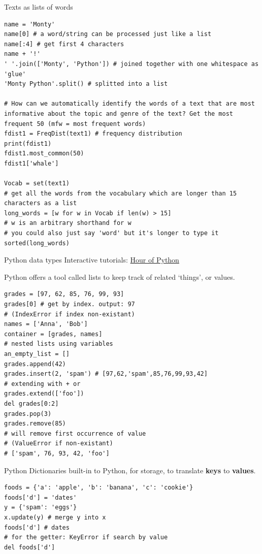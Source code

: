 \documentclass[10pt]{beamer}
\begin{document}
\begin{frame}{Texts as lists of words} 
\begin{verbatim}
name = 'Monty'
name[0] # a word/string can be processed just like a list
name[:4] # get first 4 characters
name + '!'
' '.join(['Monty', 'Python']) # joined together with one whitespace as 'glue'
'Monty Python'.split() # splitted into a list

# How can we automatically identify the words of a text that are most informative about the topic and genre of the text? Get the most frequent 50 (mfw = most frequent words)
fdist1 = FreqDist(text1) # frequency distribution
print(fdist1)
fdist1.most_common(50)
fdist1['whale']

Vocab = set(text1)
# get all the words from the vocabulary which are longer than 15 characters as a list
long_words = [w for w in Vocab if len(w) > 15] 
# w is an arbitrary shorthand for w
# you could also just say 'word' but it's longer to type it
sorted(long_words)
\end{verbatim}
\end{frame}



\begin{frame}{Python data types}
Interactive tutorials: \href{https://hourofpython.com/}{Hour of Python}

Python offers a tool called lists to keep track of related `things', or values.

\begin{verbatim}
grades = [97, 62, 85, 76, 99, 93]
grades[0] # get by index. output: 97
# (IndexError if index non-existant)
names = ['Anna', 'Bob']
container = [grades, names] 
# nested lists using variables
an_empty_list = []
grades.append(42)
grades.insert(2, 'spam') # [97,62,'spam',85,76,99,93,42]
# extending with + or 
grades.extend(['foo'])
del grades[0:2]
grades.pop(3)
grades.remove(85)
# will remove first occurrence of value
# (ValueError if non-existant)
# ['spam', 76, 93, 42, 'foo']
\end{verbatim}
\end{frame}

\begin{frame}{Python Dictionaries}
 built-in to Python, for storage, to translate \textbf{keys} to \textbf{values}.

 \begin{verbatim}
foods = {'a': 'apple', 'b': 'banana', 'c': 'cookie'}
foods['d'] = 'dates'
y = {'spam': 'eggs'}
x.update(y) # merge y into x
foods['d'] # dates 
# for the getter: KeyError if search by value
del foods['d']
\end{verbatim}
\end{frame}
\end{document}
